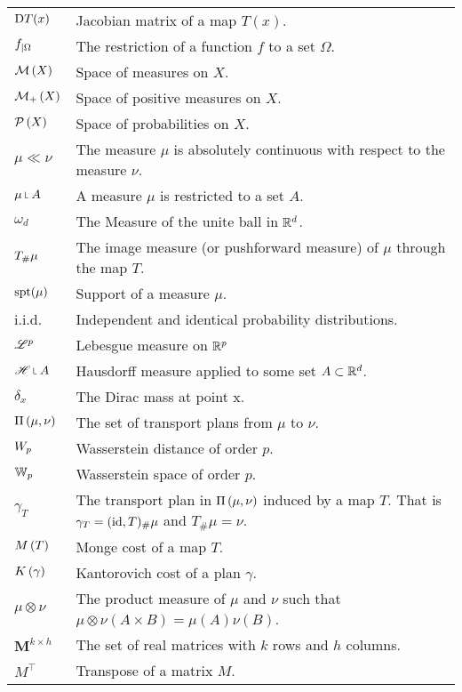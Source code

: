 \begin{tabular}{ l l }
	$\mathrm{D} T(x)$ & Jacobian matrix of a map $T(x)$. \\
	${f}_{\left| \Omega \right.}$ & The restriction of a function $f$ to a set $\Omega$. \\
	$\mathcal{M}\left( X \right)$ & Space of measures on $X$. \\
	$\mathcal{M}_+\left( X \right)$ & Space of positive measures on $X$. \\
	$\mathcal{P}\left( X \right)$ & Space of probabilities on $X$. \\	
	$\mu \ll\nu$ & The measure $\mu$ is absolutely continuous with respect to the measure $\nu$. \\
	$\mu \measurerestr A$ & A measure $\mu$ is restricted to a set $A$.\\
	$\omega_d$ & The Measure of the unite ball in $\mathbb{R}^d$. \\
	${T}_{\#} \mu$ &  The image measure (or pushforward measure) of $\mu$ through the map $T$.\\
	$\mathrm{spt}(\mu)$& Support of a measure $\mu$.\\
	i.i.d. & Independent and identical probability distributions.\\
	$\mathscr{L}^p$ & Lebesgue measure on $\mathbb{R}^p$\\
	$\Hausdorff\measurerestr A$ & Hausdorff measure applied to some set $A \subset \mathbb{R}^d$. \\
	$\delta_x$ & The Dirac mass at point x. \\
	$\Pi\left(\mu, \nu\right)$ & The set of transport plans from $\mu$ to $\nu$.\\
	$W_{p}$ & Wasserstein distance of order $p$. \\	
	$\mathbb{W}_{p}$ & Wasserstein space of order $p$.\\
 	$\gamma_T$ & The transport plan in $\Pi\left(\mu, \nu\right)$ induced by a map $T$. That is $\gamma_T = (\mathrm{id}, T)_\#\mu$ and $T_\#\mu=\nu$. \\
	$M\left(T\right)$ & Monge cost of a map $T$. \\
	$K\left(\gamma\right)$ & Kantorovich cost of a plan $\gamma$. \\	
	$\mu \otimes \nu$ & The product measure of $\mu$ and $\nu$ such that $\mu \otimes \nu (A\times B)= \mu(A)\nu(B)$.\\
	$\mathbf{M}^{k\times h}$ & The set of real matrices with $k$ rows and $h$ columns. \\
	$M^\top$ & Transpose of a matrix $M$. \\
\end{tabular}

